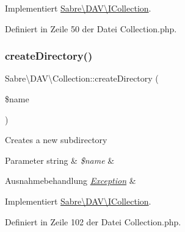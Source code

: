 Implementiert \mbox{\hyperlink{interface_sabre_1_1_d_a_v_1_1_i_collection_a81b44dc1354370890279af58c34c7375}{Sabre\textbackslash{}\+D\+A\+V\textbackslash{}\+I\+Collection}}.



Definiert in Zeile 50 der Datei Collection.\+php.

\mbox{\label{class_sabre_1_1_d_a_v_1_1_collection_a575855fe925f4aae78a6a5fd829029ff}} 
\subsubsection{\texorpdfstring{create\+Directory()}{createDirectory()}}
{\footnotesize\ttfamily Sabre\textbackslash{}\+D\+A\+V\textbackslash{}\+Collection\+::create\+Directory (\begin{DoxyParamCaption}\item[{}]{\$name }\end{DoxyParamCaption})}

Creates a new subdirectory


\begin{DoxyParams}[1]{Parameter}
string & {\em \$name} & \\
\hline
\end{DoxyParams}

\begin{DoxyExceptions}{Ausnahmebehandlung}
{\em \mbox{\hyperlink{class_sabre_1_1_d_a_v_1_1_exception}{Exception}}} & \\
\hline
\end{DoxyExceptions}


Implementiert \mbox{\hyperlink{interface_sabre_1_1_d_a_v_1_1_i_collection_a11e8eb888fffe1d792acebbe5bc59243}{Sabre\textbackslash{}\+D\+A\+V\textbackslash{}\+I\+Collection}}.



Definiert in Zeile 102 der Datei Collection.\+php.

\mbox{\label{class_sabre_1_1_d_a_v_1_1_collection_af2ab7895780c34b2e0eb4d7c3972d0f3}} 
